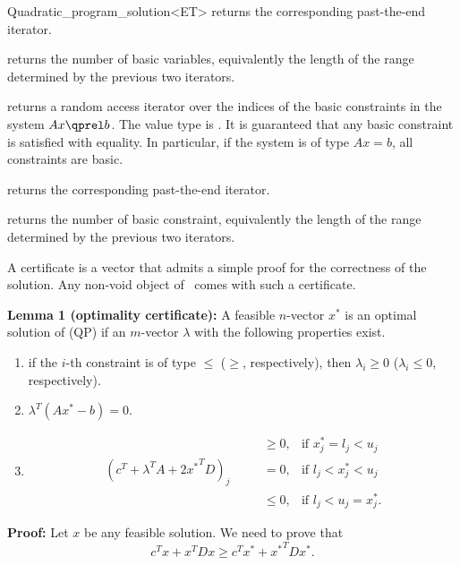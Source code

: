 \begin{ccRefClass}{Quadratic_program_solution<ET>}
{returns the corresponding past-the-end iterator.}

{returns the number of basic variables, equivalently the length
of the range determined by the previous two iterators.}

\ccExample
{}

{returns a random access iterator over the indices of the basic
constraints in the system $Ax\qprel b$. The value type is . 
It is guaranteed that any basic constraint is satisfied with equality.
In particular, if the system is of type $Ax=b$, all constraints are
basic.}

{returns the corresponding past-the-end iterator.}

{returns the number of basic constraint, equivalently the length
of the range determined by the previous two iterators.}

\begin{ccAdvanced}

A certificate is a vector that admits a simple proof for the 
correctness of the solution. Any non-void object of \ccRefName\ 
comes with such a certificate.

{\bf Lemma 1 (optimality certificate):} A feasible $n$-vector $x^*$ 
is an optimal solution of (QP) if an $m$-vector $\lambda$ with the
following properties exist.
\begin{enumerate}
\item if the $i$-th constraint is of type $\leq$ ($\geq$, respectively), 
then $\lambda_i\geq 0$ ($\lambda_i\leq 0$, respectively).
\item $\lambda^T(Ax^*-b) = 0$.
\item \[
\begin{array}{llll}
&&\geq 0, & \mbox{if $x^*_j = l_j < u_j$} \\
(c^T + \lambda^T A + 2{x^*}^TD)_j& \quad  &= 0, & \mbox{if $l_j < x^*_j < u_j$} \\
&&\leq 0, & \mbox{if $l_j < u_j = x^*_j$.}
\end{array}\]
\end{enumerate}

{\bf Proof:} Let $x$ be any feasible solution. We need to prove that
\[c^Tx + x^TDx \geq c^Tx^* + {x^*}^TDx^*.\]


\end{ccAdvanced}
\end{ccRefClass}

